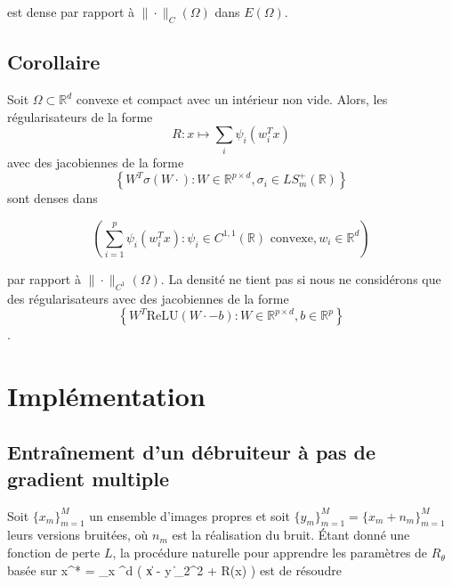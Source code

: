 \documentclass[a4paper, 12pt]{report} %
\begin{document}
est dense par rapport à \( \| \cdot \|_C(\Omega) \) dans \( E(\Omega) \).
\subsection*{Corollaire}
Soit \( \Omega \subset \mathbb{R}^d \) convexe et compact avec un intérieur non vide. Alors, les régularisateurs de la forme \[
R: x \mapsto \sum_{i} \psi_i(w_i^T x)
\]
 avec des jacobiennes de la forme \[
\left\{ W^T \sigma(W \cdot) : W \in \mathbb{R}^{p \times d}, \sigma_i \in LS_m^+(\mathbb{R}) \right\}
\] sont denses dans 

\[
\left( \sum_{i=1}^p \psi_i(w_i^T x) : \psi_i \in C^{1,1}(\mathbb{R}) \text{ convexe}, w_i \in \mathbb{R}^d \right)
\]

par rapport à \( \| \cdot \|_{C^1}(\Omega) \). La densité ne tient pas si nous ne considérons que des régularisateurs avec des jacobiennes de la forme \[
\left\{ W^T \text{ReLU}(W \cdot - b) : W \in \mathbb{R}^{p \times d}, b \in \mathbb{R}^p \right\}
\]. 
\section{Implémentation}
\subsection{Entraînement d'un débruiteur à pas de gradient multiple}
Soit \( \{x_m\}_{m=1}^M \) un ensemble d'images propres et soit \( \{y_m\}_{m=1}^M = \{x_m + n_m\}_{m=1}^M \) leurs versions bruitées, où \( n_m \) est la réalisation du bruit. Étant donné une fonction de perte \( L \), la procédure naturelle pour apprendre les paramètres de \( R_\theta \) basée sur x^* = \arg \min_{x \in {}^d} \left(  \| x - y \|_2^2 + \lambda R(x) \right)
\] est de résoudre 
\end{document}
